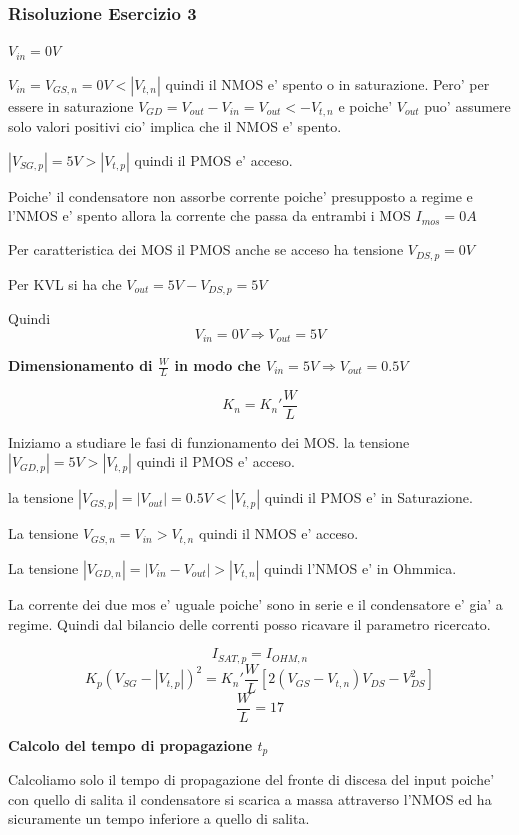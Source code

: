 \documentclass[\main/main.tex]{subfiles}
\begin{document}
\clearpage
\subsubsection{Risoluzione Esercizio 3}

\textbf{$V_{in} = 0V$}

$V_{in} = V_{GS,n} = 0V < |V_{t,n}|$ quindi il NMOS e' spento o in saturazione.
Pero' per essere in saturazione $V_{GD} = V_{out} - V_{in} = V_{out} < -V_{t,n}$
e poiche' $V_{out}$ puo' assumere solo valori positivi cio' implica che il NMOS e' spento.

$|V_{SG,p}| = 5V > |V_{t,p}|$ quindi il PMOS e' acceso.

Poiche' il condensatore non assorbe corrente poiche' presupposto a regime e l'NMOS e' spento allora la corrente che passa da entrambi i MOS $I_{mos} = 0A$

Per caratteristica dei MOS il PMOS anche se acceso ha tensione $V_{DS,p} = 0V$

Per KVL si ha che $V_{out} = 5V - V_{DS,p} = 5V$

Quindi \[ V_{in} = 0V \Rightarrow V_{out} = 5V\]

\textbf{Dimensionamento di $\frac{W}{L}$ in modo che $V_{in} = 5V \Rightarrow V_{out} = 0.5V$}

\[ K_n = K_n' \frac{W}{L} \]

Iniziamo a studiare le fasi di funzionamento dei MOS.
la tensione $|V_{GD,p}| = 5V > |V_{t,p}|$ quindi il PMOS e' acceso.

la tensione $|V_{GS,p}| = |V_{out}| = 0.5V < |V_{t,p}|$ quindi il PMOS e' in Saturazione.

La tensione $V_{GS,n} = V_{in} > V_{t,n}$ quindi il NMOS e' acceso.

La tensione $|V_{GD,n}| = |V_{in} - V_{out}| > |V_{t,n}|$ quindi l'NMOS e' in Ohmmica.

La corrente dei due mos e' uguale poiche' sono in serie e il condensatore e' gia' a regime.
Quindi dal bilancio delle correnti posso ricavare il parametro ricercato.

\[I_{SAT,p} = I_{OHM,n}\]
\[K_p \left(V_{SG} - |V_{t,p}| \right)^2 = K_n' \frac{W}{L} \left[ 2 \left( V_{GS} - V_{t,n} \right) V_{DS} - V_{DS}^2 \right]\]
\[\frac{W}{L} = 17\]

\textbf{Calcolo del tempo di propagazione $t_p$}

Calcoliamo solo il tempo di propagazione del fronte di discesa del input poiche' con quello di salita il condensatore si scarica a massa attraverso l'NMOS ed ha sicuramente un tempo inferiore a quello di salita.
\end{document}

